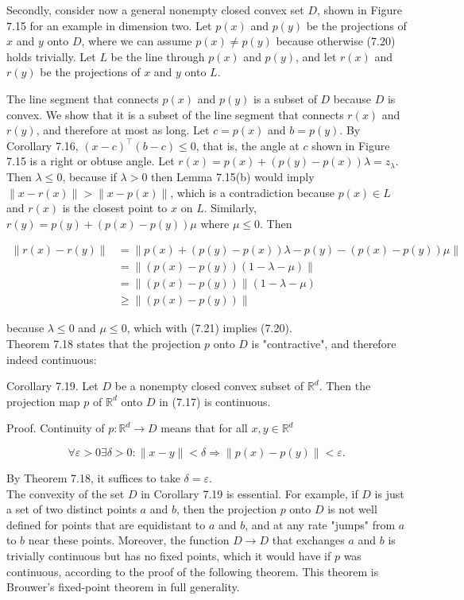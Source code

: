 \documentclass[12pt]{article}
\begin{document}
Secondly, consider now a general nonempty closed convex set $D$, shown in Figure 7.15 for an example in dimension two. Let $p(x)$ and $p(y)$ be the projections of $x$ and $y$ onto $D$, where we can assume $p(x) \neq p(y)$ because otherwise (7.20) holds trivially. Let $L$ be the line through $p(x)$ and $p(y)$, and let $r(x)$ and $r(y)$ be the projections of $x$ and $y$ onto $L$.

The line segment that connects $p(x)$ and $p(y)$ is a subset of $D$ because $D$ is convex. We show that it is a subset of the line segment that connects $r(x)$ and $r(y)$, and therefore at most as long. Let $c=p(x)$ and $b=p(y)$. By Corollary 7.16, $(x-c)^{\top}(b-c) \leq 0$, that is, the angle at $c$ shown in Figure 7.15 is a right or obtuse angle. Let $r(x)=p(x)+(p(y)-p(x)) \lambda=z_{\lambda}$. Then $\lambda \leq 0$, because if $\lambda>0$ then Lemma 7.15(b) would imply $\|x-r(x)\|>\|x-p(x)\|$, which is a contradiction because $p(x) \in L$ and $r(x)$ is the closest point to $x$ on $L$. Similarly, $r(y)=p(y)+(p(x)-p(y)) \mu$ where $\mu \leq 0$. Then

$$
\begin{aligned}
\|r(x)-r(y)\| & =\|p(x)+(p(y)-p(x)) \lambda-p(y)-(p(x)-p(y)) \mu\| \\
& =\|(p(x)-p(y))(1-\lambda-\mu)\| \\
& =\|(p(x)-p(y))\|(1-\lambda-\mu) \\
& \geq\|(p(x)-p(y))\|
\end{aligned}
$$

because $\lambda \leq 0$ and $\mu \leq 0$, which with (7.21) implies (7.20).\\
Theorem 7.18 states that the projection $p$ onto $D$ is "contractive", and therefore indeed continuous:

Corollary 7.19. Let $D$ be a nonempty closed convex subset of $\mathbb{R}^{d}$. Then the projection map $p$ of $\mathbb{R}^{d}$ onto $D$ in (7.17) is continuous.

Proof. Continuity of $p: \mathbb{R}^{d} \rightarrow D$ means that for all $x, y \in \mathbb{R}^{d}$

$$
\forall \varepsilon>0 \exists \delta>0:\|x-y\|<\delta \Rightarrow\|p(x)-p(y)\|<\varepsilon .
$$

By Theorem 7.18, it suffices to take $\delta=\varepsilon$.\\
The convexity of the set $D$ in Corollary 7.19 is essential. For example, if $D$ is just a set of two distinct points $a$ and $b$, then the projection $p$ onto $D$ is not well defined for points that are equidistant to $a$ and $b$, and at any rate "jumps" from $a$ to $b$ near these points. Moreover, the function $D \rightarrow D$ that exchanges $a$ and $b$ is trivially continuous but has no fixed points, which it would have if $p$ was continuous, according to the proof of the following theorem. This theorem is Brouwer's fixed-point theorem in full generality.
\end{document}
